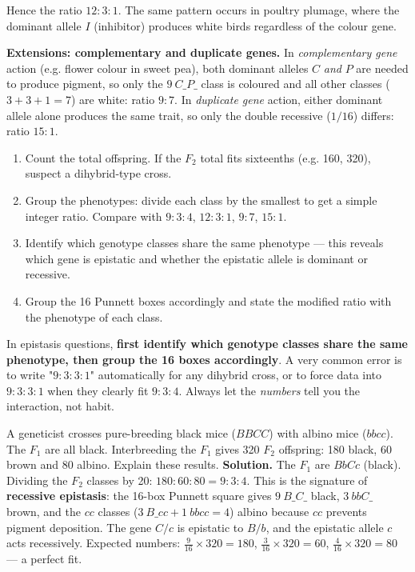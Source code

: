 \documentclass[11pt]{article}
\begin{document}
Hence the ratio $12:3:1$. The same pattern occurs in poultry plumage, where the dominant allele $I$ (inhibitor) produces white birds regardless of the colour gene.

\textbf{Extensions: complementary and duplicate genes.} In \emph{complementary gene} action (e.g. flower colour in sweet pea), both dominant alleles $C$ \emph{and} $P$ are needed to produce pigment, so only the $9\ C\_P\_$ class is coloured and all other classes ($3+3+1=7$) are white: ratio $9:7$. In \emph{duplicate gene} action, either dominant allele alone produces the same trait, so only the double recessive ($1/16$) differs: ratio $15:1$.

\begin{methode}
\begin{enumerate}
\item Count the total offspring. If the $F_2$ total fits sixteenths (e.g. 160, 320), suspect a dihybrid-type cross.
\item Group the phenotypes: divide each class by the smallest to get a simple integer ratio. Compare with $9:3:4$, $12:3:1$, $9:7$, $15:1$.
\item Identify which genotype classes share the same phenotype — this reveals which gene is epistatic and whether the epistatic allele is dominant or recessive.
\item Group the 16 Punnett boxes accordingly and state the modified ratio with the phenotype of each class.
\end{enumerate}
\end{methode}

\begin{attention}
In epistasis questions, \textbf{first identify which genotype classes share the same phenotype, then group the 16 boxes accordingly}. A very common error is to write "$9:3:3:1$" automatically for any dihybrid cross, or to force data into $9:3:3:1$ when they clearly fit $9:3:4$. Always let the \emph{numbers} tell you the interaction, not habit.
\end{attention}

\begin{exoresolu}
A geneticist crosses pure-breeding black mice ($BBCC$) with albino mice ($bbcc$). The $F_1$ are all black. Interbreeding the $F_1$ gives 320 $F_2$ offspring: 180 black, 60 brown and 80 albino. Explain these results.
\tcblower
\textbf{Solution.} The $F_1$ are $BbCc$ (black). Dividing the $F_2$ classes by 20: $180:60:80 = 9:3:4$. This is the signature of \textbf{recessive epistasis}: the 16-box Punnett square gives $9\ B\_C\_$ black, $3\ bbC\_$ brown, and the $cc$ classes ($3\ B\_cc + 1\ bbcc = 4$) albino because $cc$ prevents pigment deposition. The gene $C/c$ is epistatic to $B/b$, and the epistatic allele $c$ acts recessively. Expected numbers: $\tfrac{9}{16}\times 320 = 180$, $\tfrac{3}{16}\times 320 = 60$, $\tfrac{4}{16}\times 320 = 80$ — a perfect fit.
\end{exoresolu}
\end{document}

